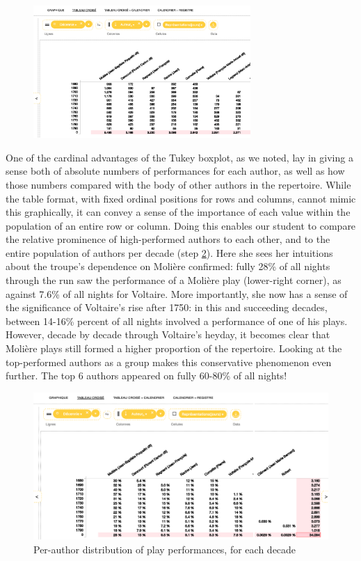 \documentclass[	DIV=calc,%
							paper=a4,%
							fontsize=11pt,%
							twocolumn]{scrartcl}	 					%
\begin{document}
\begin{figure}
  \centering
	\includegraphics[width=3.25in]{steps/sorted.png}
	\caption{}
	\label{fig:sorted}
\end{figure}

One of the cardinal advantages of the Tukey boxplot, as we noted, lay in giving a sense both of absolute numbers of performances for each author, as well as how those numbers compared with the body of other authors in the repertoire.  While the table format, with fixed ordinal positions for rows and columns, cannot mimic this graphically, it can convey a sense of the importance of each value within the population of an entire row or column.  Doing this enables our student to compare the relative prominence of high-performed authors to each other, and to the entire population of authors per decade (step \ref{fig:percents}).  Here she sees her intuitions about the troupe’s dependence on Molière confirmed: fully 28\% of all nights through the run saw the performance of a Molière play (lower-right corner), as against 7.6\% of all nights for Voltaire.  More importantly, she now has a sense of the significance of Voltaire’s rise after 1750: in this and succeeding decades, between 14-16\% percent of all nights involved a performance of one of his plays.  However, decade by decade through Voltaire’s heyday, it becomes clear that Molière plays still formed a higher proportion of the repertoire.  Looking at the top-performed authors as a group makes this conservative phenomenon even further.  The top 6 authors appeared on fully 60-80\% of all nights!

\begin{figure}
  \centering
	\includegraphics[width=7in]{steps/percents.png}
	\caption{Per-author distribution of play performances, for each decade}
	\label{fig:percents}
\end{figure}
\end{document}
